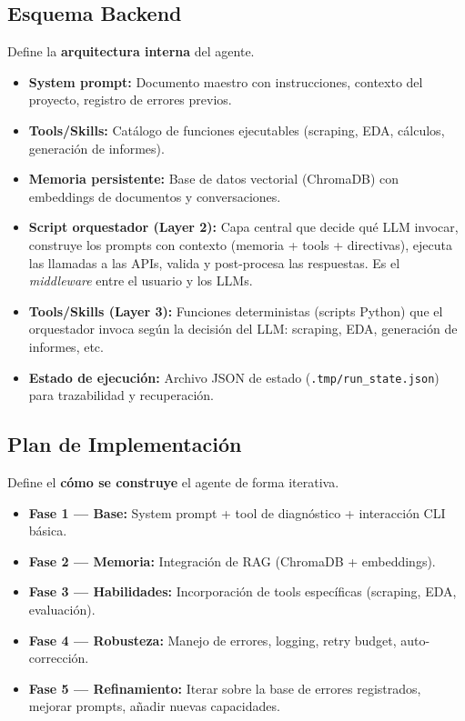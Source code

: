 \documentclass[12pt,a4paper]{article}
\begin{document}
\subsection{Esquema Backend}

Define la \textbf{arquitectura interna} del agente.

\begin{itemize}[leftmargin=*]
  \item \textbf{System prompt:} Documento maestro con instrucciones, contexto del proyecto, registro de errores previos.
  \item \textbf{Tools/Skills:} Catálogo de funciones ejecutables (scraping, EDA, cálculos, generación de informes).
  \item \textbf{Memoria persistente:} Base de datos vectorial (ChromaDB) con embeddings de documentos y conversaciones.
  \item \textbf{Script orquestador (Layer 2):} Capa central que decide qué LLM invocar, construye los prompts con contexto (memoria + tools + directivas), ejecuta las llamadas a las APIs, valida y post-procesa las respuestas. Es el \textit{middleware} entre el usuario y los LLMs.
  \item \textbf{Tools/Skills (Layer 3):} Funciones deterministas (scripts Python) que el orquestador invoca según la decisión del LLM: scraping, EDA, generación de informes, etc.
  \item \textbf{Estado de ejecución:} Archivo JSON de estado (\texttt{.tmp/run\_state.json}) para trazabilidad y recuperación.
\end{itemize}

\subsection{Plan de Implementación}

Define el \textbf{cómo se construye} el agente de forma iterativa.

\begin{itemize}[leftmargin=*]
  \item \textbf{Fase 1 --- Base:} System prompt + tool de diagnóstico + interacción CLI básica.
  \item \textbf{Fase 2 --- Memoria:} Integración de RAG (ChromaDB + embeddings).
  \item \textbf{Fase 3 --- Habilidades:} Incorporación de tools específicas (scraping, EDA, evaluación).
  \item \textbf{Fase 4 --- Robusteza:} Manejo de errores, logging, retry budget, auto-corrección.
  \item \textbf{Fase 5 --- Refinamiento:} Iterar sobre la base de errores registrados, mejorar prompts, añadir nuevas capacidades.
\end{itemize}
\end{document}
